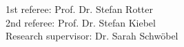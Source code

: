 \newpage
\thispagestyle{empty} 

\vspace*{\fill} 

\noindent
{\Large 1st referee: Prof. Dr. Stefan Rotter\\[0.5cm]
2nd referee: Prof. Dr. Stefan Kiebel\\[0.5cm]
Research supervisor: Dr. Sarah Schwöbel\par}